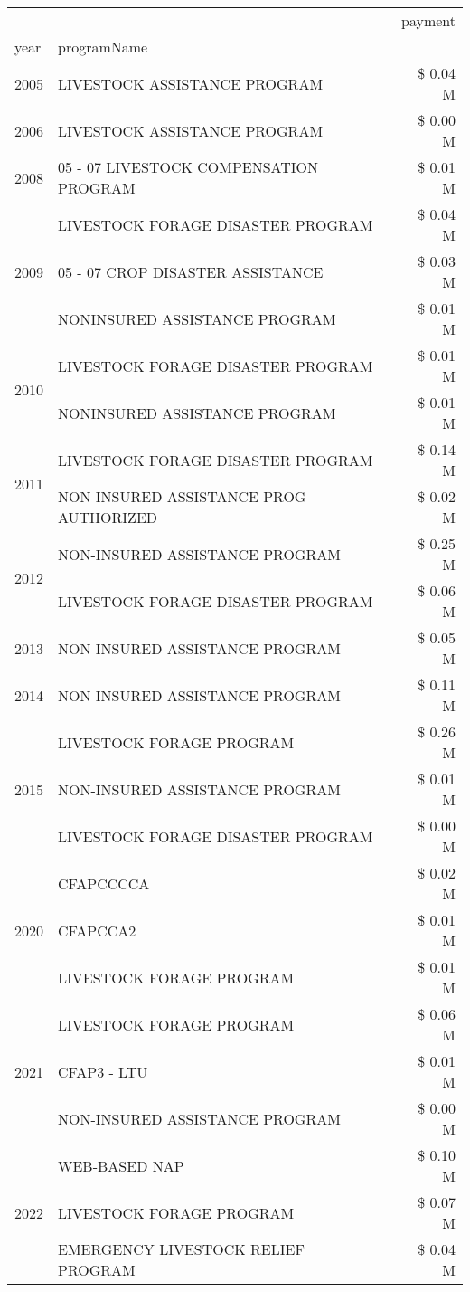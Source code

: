 \begin{tabular}{llr}
\toprule
 &  & payment \\
year & programName &  \\
\midrule
2005 & LIVESTOCK ASSISTANCE PROGRAM & \$ 0.04 M \\
\cline{1-3}
2006 & LIVESTOCK ASSISTANCE PROGRAM & \$ 0.00 M \\
\cline{1-3}
2008 & 05 - 07 LIVESTOCK COMPENSATION PROGRAM & \$ 0.01 M \\
\cline{1-3}
\multirow[t]{3}{*}{2009} & LIVESTOCK FORAGE DISASTER  PROGRAM & \$ 0.04 M \\
 & 05 - 07 CROP DISASTER ASSISTANCE & \$ 0.03 M \\
 & NONINSURED ASSISTANCE PROGRAM & \$ 0.01 M \\
\cline{1-3}
\multirow[t]{2}{*}{2010} & LIVESTOCK FORAGE DISASTER PROGRAM & \$ 0.01 M \\
 & NONINSURED ASSISTANCE PROGRAM & \$ 0.01 M \\
\cline{1-3}
\multirow[t]{2}{*}{2011} & LIVESTOCK FORAGE DISASTER PROGRAM & \$ 0.14 M \\
 & NON-INSURED ASSISTANCE PROG AUTHORIZED & \$ 0.02 M \\
\cline{1-3}
\multirow[t]{2}{*}{2012} & NON-INSURED ASSISTANCE PROGRAM & \$ 0.25 M \\
 & LIVESTOCK FORAGE DISASTER PROGRAM & \$ 0.06 M \\
\cline{1-3}
2013 & NON-INSURED ASSISTANCE PROGRAM & \$ 0.05 M \\
\cline{1-3}
2014 & NON-INSURED ASSISTANCE PROGRAM & \$ 0.11 M \\
\cline{1-3}
\multirow[t]{3}{*}{2015} & LIVESTOCK FORAGE PROGRAM & \$ 0.26 M \\
 & NON-INSURED ASSISTANCE PROGRAM & \$ 0.01 M \\
 & LIVESTOCK FORAGE DISASTER PROGRAM & \$ 0.00 M \\
\cline{1-3}
\multirow[t]{3}{*}{2020} & CFAPCCCCA & \$ 0.02 M \\
 & CFAPCCA2 & \$ 0.01 M \\
 & LIVESTOCK FORAGE PROGRAM & \$ 0.01 M \\
\cline{1-3}
\multirow[t]{3}{*}{2021} & LIVESTOCK FORAGE PROGRAM & \$ 0.06 M \\
 & CFAP3 - LTU & \$ 0.01 M \\
 & NON-INSURED ASSISTANCE PROGRAM & \$ 0.00 M \\
\cline{1-3}
\multirow[t]{3}{*}{2022} & WEB-BASED NAP & \$ 0.10 M \\
 & LIVESTOCK FORAGE PROGRAM & \$ 0.07 M \\
 & EMERGENCY LIVESTOCK RELIEF PROGRAM & \$ 0.04 M \\
\cline{1-3}
\bottomrule
\end{tabular}

